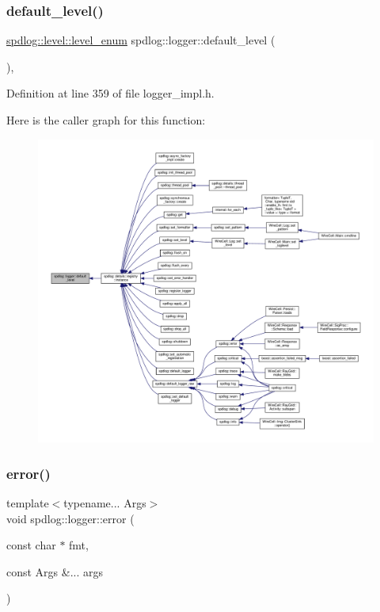 \subsubsection{\texorpdfstring{default\+\_\+level()}{default\_level()}}
{\footnotesize\ttfamily \hyperlink{namespacespdlog_1_1level_a35f5227e5daf228d28a207b7b2aefc8b}{spdlog\+::level\+::level\+\_\+enum} spdlog\+::logger\+::default\+\_\+level (\begin{DoxyParamCaption}{ }\end{DoxyParamCaption})\hspace{0.3cm}{\ttfamily [inline]}, {\ttfamily [static]}}



Definition at line 359 of file logger\+\_\+impl.\+h.

Here is the caller graph for this function\+:
\nopagebreak
\begin{figure}[H]
\begin{center}
\leavevmode
\includegraphics[width=350pt]{classspdlog_1_1logger_a0d0307a6501a9f56689c386a006991fe_icgraph}
\end{center}
\end{figure}
\mbox{\label{classspdlog_1_1logger_a144338f88fd2d2bec2cae951e214a9a5}} 
\subsubsection{\texorpdfstring{error()}{error()}\hspace{0.1cm}{\footnotesize\ttfamily [1/2]}}
{\footnotesize\ttfamily template$<$typename... Args$>$ \\
void spdlog\+::logger\+::error (\begin{DoxyParamCaption}\item[{const char $\ast$}]{fmt,  }\item[{const Args \&...}]{args }\end{DoxyParamCaption})\hspace{0.3cm}{\ttfamily [inline]}}



